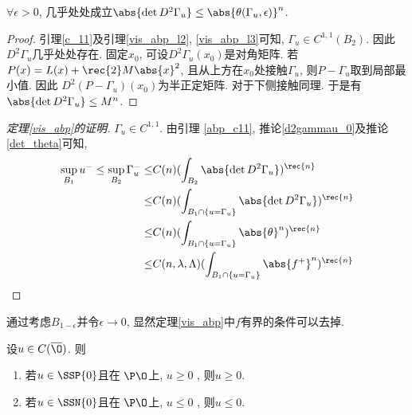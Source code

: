 \begin{corollary}\label{det_theta}
    $\forall \epsilon>0$, 几乎处处成立$\abs{\det D^2\Gamma_u} \le \abs{\theta(\Gamma_u,\epsilon)}^n$.
\end{corollary}
\begin{proof}
    引理\eqref{c_11}及引理\eqref{vis_abp_l2}, \eqref{vis_abp_l3}可知, $\Gamma_u\in C^{1, 1}(B_2)$.  因此$D^2\Gamma_u$几乎处处存在.  固定$x_0$, 可设$D^2\Gamma_u(x_0)$是对角矩阵.  若$P(x)=L(x) + \rec{2}M\abs{x}^2$, 且从上方在$x_0$处接触$\Gamma_u$, 则$P-\Gamma_u$取到局部最小值. 因此 $D^2(P-\Gamma_u)(x_0)$为半正定矩阵. 对于下侧接触同理.  于是有$\abs{\det D^2\Gamma_u} \le M^n$.
\end{proof}
\begin{proof}[定理\eqref{vis_abp}的证明]
    $\Gamma_u \in C^{1,1}$. 由引理 \eqref{abp_c11}, 推论\eqref{d2gammau_0}及推论 \eqref{det_theta}可知, 
    \begin{equation}
        \begin{split}
            \sup_{B_1}u^- \le \sup_{B_2}\Gamma_u^- \le & C(n)(\int_{B_2}\abs{\det D^2\Gamma_u})^\rec{n} \\
            \le & C(n)(\int_{B_1 \cap \{u=\Gamma_u\}}\abs{\det D^2\Gamma_u})^\rec{n} \\
            \le & C(n)(\int_{B_1\cap \{u=\Gamma_u\}}\abs{\theta}^n)^\rec{n} \\
            \le & C(n, \lambda, \Lambda)(\int_{B_1\cap \{u=\Gamma_u\}}\abs{f^+}^n)^\rec{n}
        \end{split}
    \end{equation}
\end{proof}
\begin{remark}
    通过考虑$B_{1-\epsilon}$并令$\epsilon\to 0$, 显然定理\eqref{vis_abp}中$f$有界的条件可以去掉.  
\end{remark}
\begin{corollary}
    设$u \in C(\overline{\O})$.  则
    \begin{enumerate}
        \item 若$u \in \SSP{0}$且在 $\P \O$上, $u \ge 0$ , 则$ u \ge 0$.  
        \item 若$u \in \SSN{0}$且在 $\P \O$上, $u \le 0$ , 则$ u \le 0$.  
    \end{enumerate}
\end{corollary}
